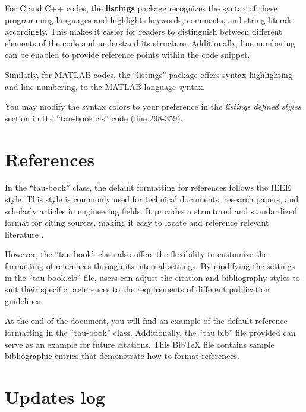 \documentclass[10pt,a4paper,twoside]{tau-book}
\begin{document}
    For C and C++ codes, the \textbf{listings} package recognizes the syntax of these programming languages and highlights keywords, comments, and string literals accordingly. This makes it easier for readers to distinguish between different elements of the code and understand its structure. Additionally, line numbering can be enabled to provide reference points within the code snippet.

    

    Similarly, for MATLAB codes, the ``listings'' package offers syntax highlighting and line numbering, to the MATLAB language syntax.
    
    
    
    You may modify the syntax colors to your preference in the \textit{listings defined styles} section in the ``tau-book.cls'' code (line 298-359).  

\section{References}

    In the ``tau-book'' class, the default formatting for references follows the IEEE style. This style is commonly used for technical documents, research papers, and scholarly articles in engineering fields. It provides a structured and standardized format for citing sources, making it easy to locate and reference relevant literature \cite{einstein}.

    However, the ``tau-book'' class also offers the flexibility to customize the formatting of references through its internal settings. By modifying the settings in the ``tau-book.cls'' file, users can adjust the citation and bibliography styles to suit their specific preferences to the requirements of different publication guidelines.

    At the end of the document, you will find an example of the default reference formatting \cite{dirac} in the ``tau-book'' class. Additionally, the ``tau.bib'' file provided can serve as an example for future citations. This BibTeX file contains sample bibliographic entries that demonstrate how to format references.

\section{Updates log}
\end{document}
